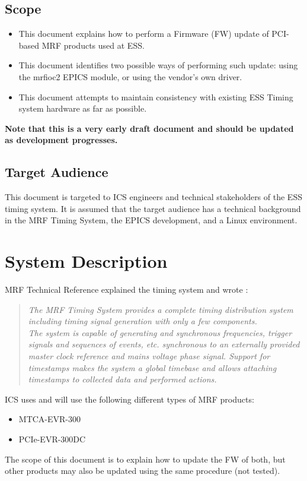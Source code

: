 \documentclass[11pt
  , a4paper
  , article
  , oneside
  , showtrims
]{memoir}
\begin{document}
\section{Scope}
\begin{itemize}
\item This document explains how to perform a Firmware (FW) update of PCI-based MRF products used at ESS.
\item This document identifies two possible ways of performing such update: using the mrfioc2 EPICS module, or using the vendor's own driver.
\item This document attempts to maintain consistency with existing ESS Timing system hardware as far as possible.
\end{itemize}
\textbf{Note that this is a very early draft document and should be updated as development progresses.}

\section{Target Audience}
This document is targeted to ICS engineers and technical stakeholders of the ESS timing system. It is assumed that the target audience has a technical background in the MRF Timing System, the EPICS development, and a Linux environment.

\chapter{System Description}
MRF Technical Reference \citep[see][p5]{MRFEVENTSYSTEMDC} explained the timing system and wrote :
\blockquote{\textit{The MRF Timing System provides a complete timing distribution system including timing signal generation with only a few components.\\The system is capable of generating and synchronous frequencies, trigger signals and sequences of events, etc. synchronous to an externally provided master clock reference and mains voltage phase signal. Support for timestamps makes the system a global timebase and allows attaching timestamps to collected data and performed actions.}}

ICS uses and will use the following different types of MRF products:
\begin{itemize}
\item MTCA-EVR-300
\item PCIe-EVR-300DC
\end{itemize}

The scope of this document is to explain how to update the FW of both, but other products may also be updated using the same procedure (not tested).
\end{document}
